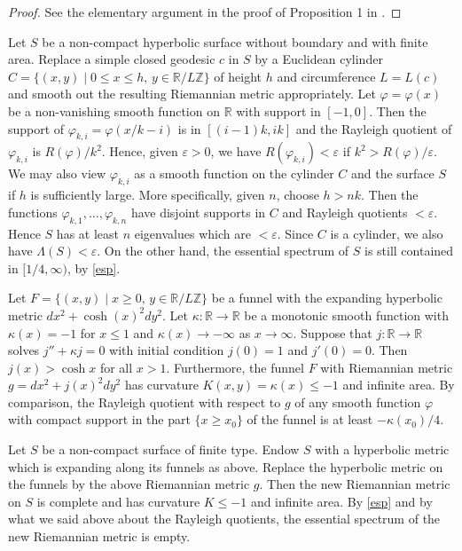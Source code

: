 \begin{proof}
See the elementary argument in the proof of Proposition 1 in \cite{Bae}.
\end{proof}

\begin{exas}\label{exesp}
\begin{inparaenum}[1)]
\item\label{many}
Let $S$ be a non-compact hyperbolic surface without boundary and with finite area.
Replace a simple closed geodesic $c$ in $S$ by a Euclidean cylinder
$C=\{(x,y)\mid 0\le x\le h,\, y\in{\mathbb R}/L{\mathbb Z}\}$
of height $h$ and circumference $L=L(c)$
and smooth out the resulting Riemannian metric appropriately.
Let $\varphi=\varphi(x)$ be a non-vanishing smooth function on ${\mathbb R}$
with support in $[-1,0]$.
Then the support of $\varphi_{k,i}=\varphi(x/k-i)$ is in $[(i-1)k,ik]$
and the Rayleigh quotient of $\varphi_{k,i}$ is $R(\varphi)/k^2$.
Hence, given ${\varepsilon}>0$, we have $R({\varphi}_{k,i})<{\varepsilon}$ if $k^2>R(\varphi)/{\varepsilon}$.
We may also view $\varphi_{k,i}$ as a smooth function on the cylinder $C$
and the surface $S$ if $h$ is sufficiently large.
More specifically, given $n$, choose $h>nk$.
Then the functions $\varphi_{k,1},\dots,\varphi_{k,n}$ have disjoint supports
in $C$ and Rayleigh quotients $<{\varepsilon}$.
Hence $S$ has at least $n$ eigenvalues which are $<{\varepsilon}$.
Since $C$ is a cylinder, we also have $\Lambda(S)<{\varepsilon}$.
On the other hand,
the essential spectrum of $S$ is still contained in $[1/4,\infty)$,
by \cref{esp}.

\item\label{emesp}
Let $F=\{(x,y)\mid x\ge0,\, y\in{\mathbb R}/L{\mathbb Z}\}$ be a funnel with the expanding
hyperbolic metric $dx^2+\cosh(x)^2 dy^2$.
Let $\kappa\colon{\mathbb R}\to{\mathbb R}$ be a monotonic smooth function with $\kappa(x)=-1$
for $x\le1$ and $\kappa(x)\to-\infty$ as $x\to\infty$.
Suppose that $j\colon{\mathbb R}\to{\mathbb R}$ solves $j''+\kappa j=0$
with initial condition $j(0)=1$ and $j'(0)=0$.
Then $j(x)>\cosh x$ for all $x>1$.
Furthermore, the funnel $F$ with Riemannian metric $g=dx^2+j(x)^2dy^2$
has curvature $K(x,y)=\kappa(x)\le-1$ and infinite area.
By comparison, the Rayleigh quotient with respect to $g$
of any smooth function ${\varphi}$ with compact support in the part $\{x\ge x_0\}$
of the funnel is at least $-\kappa(x_0)/4$.

Let $S$ be a non-compact surface of finite type.
Endow $S$ with a hyperbolic metric which is expanding along its funnels as above.
Replace the hyperbolic metric on the funnels by the above Riemannian metric $g$.
Then the new Riemannian metric on $S$ is complete
and has curvature $K\le-1$ and infinite area.
By \cref{esp} and by what we said above about the Rayleigh quotients,
the essential spectrum of the new Riemannian metric is empty.


\end{inparaenum}
\end{exas}
